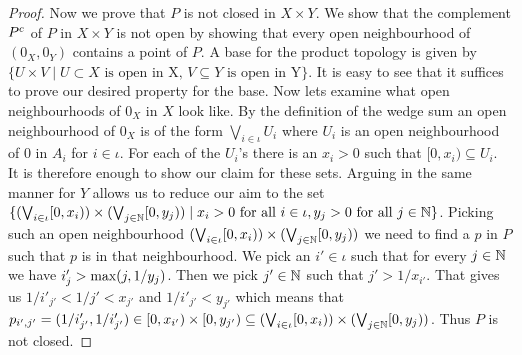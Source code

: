 \begin{proof}
    Now we prove that $P$ is not closed in $X \times Y$. 
    We show that the complement $P^{c}$ of $P$ in $X \times Y$ is not open by showing that every open neighbourhood of $(0_X, 0_Y)$ contains a point of $P$. 
    A base for the product topology is given by $\{ U \times V \mid U \subset X \text{ is open in X, } V \subseteq Y \text{ is open in Y}\}$.
    It is easy to see that it suffices to prove our desired property for the base.
    Now lets examine what open neighbourhoods of $0_X$ in $X$ look like. 
    By the definition of the wedge sum an open neighbourhood of $0_X$ is of the form $\bigvee_{i \in \iota}U_i$ where $U_i$ is an open neighbourhood of $0$ in $A_i$ for $i \in \iota$. 
    For each of the $U_i$'s there is an $x_i > 0$ such that $[0, x_i) \subseteq U_i$. 
    It is therefore enough to show our claim for these sets. 
    Arguing in the same manner for $Y$ allows us to reduce our aim to the set $\{(\bigvee_{i \in \iota}[0, x_i)) \times (\bigvee_{j \in \mathbb{N}}[0, y_j)) \mid x_i > 0 \text{ for all } i \in \iota, y_j > 0 \text{ for all } j \in \mathbb{N}\}$. 
    Picking such an open neighbourhood $(\bigvee_{i \in \iota}[0, x_i)) \times (\bigvee_{j \in \mathbb{N}}[0, y_j))$ we need to find a $p$ in $P$ such that $p$ is in that neighbourhood.
    We pick an $i' \in \iota$ such that for every $j \in \mathbb{N}$ we have $i'_j > \text{max}(j, 1/y_j)$. 
    Then we pick $j' \in \mathbb{N}$ such that $j' > 1/x_{i'}$. 
    That gives us $1/i'_{j'} < 1/j' < x_{j'}$ and $1/i'_{j'} < y_{j'}$ which means that $p_{i', j'} = (1/i'_{j'}, 1/i'_{j'}) \in [0, x_{i'}) \times [0, y_{j'}) \subseteq (\bigvee_{i \in \iota}[0, x_i)) \times (\bigvee_{j \in \mathbb{N}}[0, y_j))$.
    Thus $P$ is not closed. 
\end{proof}